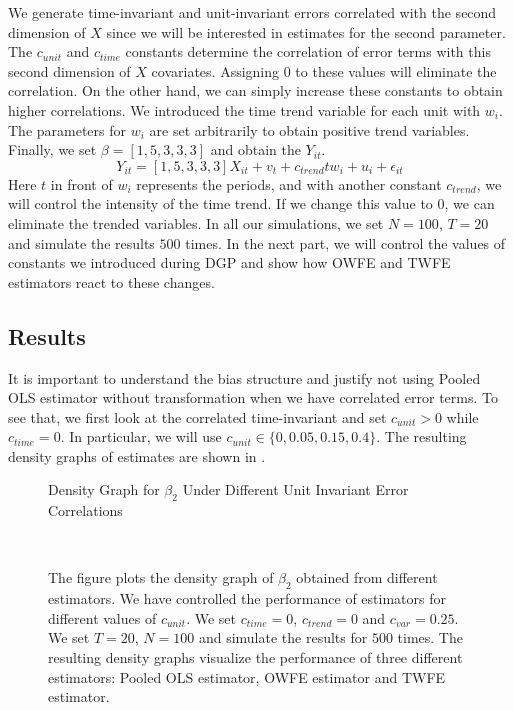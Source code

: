 \documentclass[12pt, a4paper]{article}
\begin{document}
We generate time-invariant and unit-invariant errors correlated with the
second dimension of $X$ since we will be interested in estimates
for the second parameter. The $c_{unit}$ and $c_{time}$ constants determine
the correlation of error terms with this second dimension of $X$ covariates.
Assigning $0$ to these values will eliminate the correlation.
On the other hand, we can simply increase these constants to obtain higher correlations.
We introduced the time trend variable for each unit with $w_{i}$. The parameters for $w_{i}$ are
set arbitrarily to obtain positive trend variables. Finally, we set $\beta = [1, 5, 3, 3, 3]$
and obtain the $Y_{it}$.
$$Y_{it} = [1, 5, 3, 3, 3] X_{it} + v_{t} + c_{trend} t w_{i} + u_{i} + \epsilon_{it} $$
Here $t$ in front of $w_i$ represents the periods, and with another constant $c_{trend}$, we will control the intensity of the time trend.
If we change this value to $0$, we can eliminate the trended variables. In all our simulations, we set $N = 100$, $T = 20$ and simulate the results
$500$ times. In the next part, we will control the values of constants we introduced during DGP and show how OWFE and
TWFE estimators react to these changes.


\subsection{Results}

It is important to understand the bias structure and justify not using Pooled OLS
estimator without transformation when we have correlated error terms. To see that,
we first look at the correlated time-invariant and set $c_{unit} > 0$ while
$c_{time} = 0$. In particular, we will use $c_{unit} \in \{0, 0.05, 0.15, 0.4\}$.
The resulting density graphs of estimates are shown in .

\begin{figure}[H]
    \caption{Density Graph for $ \beta_2$ Under Different Unit Invariant Error Correlations}
     \\
    \caption*{\scriptsize{The figure plots the density graph of $\beta_2$
    obtained from different estimators. We have controlled the performance of
    estimators for different values of $c_{unit}$. We set $c_{time} = 0$, $c_{trend} = 0$
    and $c_{var} = 0.25$. We set $T = 20$, $N = 100$ and simulate the results
    for $500$ times. The resulting density graphs visualize the performance
    of three different estimators: Pooled OLS estimator, OWFE estimator and  TWFE estimator.
    }}
    \label{fig:c1}
\end{figure}
\end{document}
